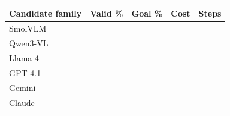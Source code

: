 \begin{tabular}{lrrrr}
\toprule
Candidate family & Valid \% & Goal \% & Cost & Steps\\\midrule
SmolVLM &  &  &  & \\
Qwen3-VL &  &  &  & \\
Llama 4 &  &  &  & \\
GPT-4.1 &  &  &  & \\
Gemini &  &  &  & \\
Claude &  &  &  & \\
\bottomrule
\end{tabular}
